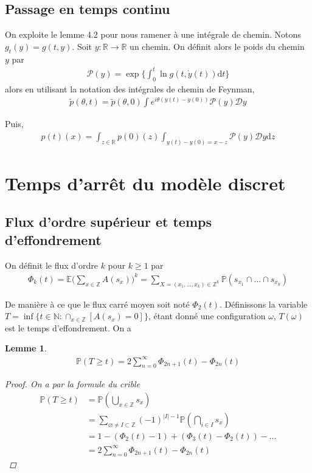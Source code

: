 \documentclass{article}
\newtheorem{lemma}[theorem]{Lemme}
\theoremstyle{definition}
\begin{document}
\subsection{Passage en temps continu}
On exploite le lemme 4.2 pour nous ramener à une intégrale de chemin. Notons $g_t(y) = g(t,y)$. Soit $y : \mathbb{R}\to \mathbb{R}$ un chemin. On définit alors le poids du chemin $y$ par \begin{align*}
	\mathcal{P}(y) = \exp\{\int_{0}^t \ln g(t, \dot{y}(t))\mathrm{d}t\}
\end{align*}
alors en utilisant la notation des intégrales de chemin de Feynman,
\begin{align*}
	\tilde{p}(\theta, t) = \tilde{p}(\theta, 0)\int e^{i\theta (y(t)-y(0))}\mathcal{P}(y)\mathcal{D}y
\end{align*}

Puis,
\begin{align*}
	p(t)(x) = \int_{z\in\mathbb{R}}p(0)(z)\int_{y(t)-y(0)=x-z} \mathcal{P}(y)\mathcal{D}y\mathrm{d}z
\end{align*}
\section{Temps d'arrêt du modèle discret}
\subsection{Flux d'ordre supérieur et temps d'effondrement}
On définit le flux d'ordre $k$ pour $k\geq 1$ par
\begin{align*}
	\Phi_k(t) = \mathds{E}\bigg(\sum_{x\in \mathbb{Z}} A(s_x)\bigg)^k = \sum_{X=(x_1,\ldots,x_k)\in\mathbb{Z}^k}\mathds{P}(s_{x_1}\cap \ldots \cap s_{x_k})
\end{align*}

De manière à ce que le flux carré moyen soit noté $\Phi_2(t)$. Définissons la variable $T = \inf\{t\in \mathbb{N} : \cap_{x\in \mathbb{Z}} [A(s_x) = 0]\}$, étant donné une configuration $\omega$, $T(\omega)$ est le temps d'effondrement. On a  
\begin{lemma}
	\begin{align*}
		\mathds{P}(T\geq t) = 2\sum_{n=0}^\infty \Phi_{2n+1}(t)-\Phi_{2n}(t)
\end{align*}
\begin{proof}
	On a par la formule du crible 
	\begin{align*}
		\mathds{P}(T\geq t) &= \mathds{P}(\bigcup_{x\in \mathbb{Z}} s_x)\\
				    &= \sum_{\varnothing \neq I \subset \mathbb{Z}} (-1)^{|I|-1} \mathds{P}(\bigcap_{i\in I}s_x)\\
				    &= 1-(\Phi_2(t)-1)+(\Phi_3(t)-\Phi_2(t))-\ldots\\
				    &= 2\sum_{n=0}^{\infty}\Phi_{2n+1}(t)-\Phi_{2n}(t)
	\end{align*}
\end{proof}
\end{lemma}
\end{document}

